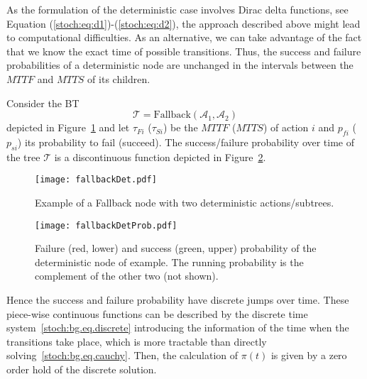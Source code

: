 
As the formulation of the deterministic case involves Dirac delta functions, see Equation (\ref{stoch:eq:d1})-(\ref{stoch:eq:d2}), the approach described above might lead to computational difficulties.
As an alternative, we can take advantage of the fact that we know the exact time of possible transitions.
Thus, the success and failure probabilities of a deterministic node are unchanged in the intervals between the $MTTF$ and $MTTS$ of its children. 

\begin{example}
 Consider the BT 
\begin{equation}
\mathcal{T}=\mbox{Fallback}(\mathcal{A}_1,\mathcal{A}_2)
\end{equation}
depicted in Figure~\ref{stoch:res.fig.BTdet} and let $\tau_{Fi}$ ($\tau_{Si}$) be the $MTTF$ ($MTTS$) of action $i$ and $p_{fi}$ ($p_{si}$) its probability to fail (succeed). The success/failure probability over time of the tree $\mathcal{T}$ is a discontinuous function depicted in Figure~\ref{stoch:res.fig.probdet}. 
\end{example} 

\begin{figure}[h]
\centering
\texttt{[image: fallbackDet.pdf]}
\caption{Example of a Fallback node with two deterministic actions/subtrees.}
\label{stoch:res.fig.BTdet}
\end{figure}

\begin{figure}[h]
\centering
\texttt{[image: fallbackDetProb.pdf]}
\caption{Failure (red, lower) and success (green, upper) probability of the deterministic node of example. The running probability is the complement of the other two (not shown). 
}
\label{stoch:res.fig.probdet}
\end{figure}

Hence the success and failure probability have discrete jumps over time. These piece-wise continuous functions can be described by the discrete time system~\eqref{stoch:bg.eq.discrete} introducing the information of the time when the transitions take place, which is more tractable than directly solving~\eqref{stoch:bg.eq.cauchy}. Then, the calculation of $\pi(t)$ is given by a zero order hold of the discrete solution.

